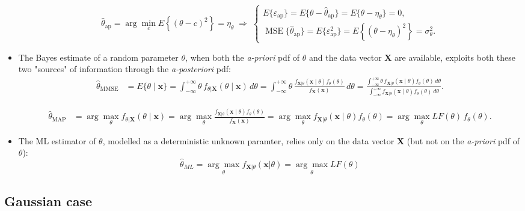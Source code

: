 \begin{itemize}
\[
\hat{\theta}_{\text{ap}}
 = \arg\min_{c} E\!\left\{(\theta - c)^{2}\right\}
 = \eta_{\theta}
 \;\Rightarrow\;
\begin{cases}
E\{\varepsilon_{\text{ap}}\}
 = E\{\theta - \hat{\theta}_{\text{ap}}\}
 = E\{\theta - \eta_{\theta}\}
 = 0, \\[4pt]
\operatorname{MSE}\{\hat{\theta}_{\text{ap}}\}
 = E\{\varepsilon_{\text{ap}}^{2}\}
 = E\!\left\{(\theta - \eta_{\theta})^{2}\right\}
 = \sigma_{\theta}^{2}.
\end{cases}
\]
\item The Bayes estimate of a random parameter \(\theta\), when both the \textit{a-priori} pdf of \(\theta\) and the data vector \textbf{X} are available, exploits both these two "sources" of information through the \textit{a-posteriori} pdf:
\begin{align*}
\hat{\theta}_{\text{MMSE}}
&= E\{\theta \mid \mathbf{x}\}
 = \int_{-\infty}^{+\infty}
   \theta \, f_{\theta|\mathbf{X}}(\theta \mid \mathbf{x}) \, d\theta
 = \int_{-\infty}^{+\infty}
   \theta \, \frac{f_{\mathbf{X}|\theta}(\mathbf{x}\mid \theta)
                 f_{\theta}(\theta)}
                {f_{\mathbf{X}}(\mathbf{x})} \, d\theta = \frac{\displaystyle
        \int_{-\infty}^{+\infty}
        \theta \, f_{\mathbf{X}|\theta}(\mathbf{x}\mid \theta)
               f_{\theta}(\theta) \, d\theta}
        {\displaystyle
        \int_{-\infty}^{+\infty}
        f_{\mathbf{X}|\theta}(\mathbf{x}\mid \theta)
        f_{\theta}(\theta) \, d\theta}.
\end{align*}

\begin{align*}
\hat{\theta}_{\text{MAP}}
&= \arg\max_{\theta} f_{\theta|\mathbf{X}}(\theta \mid \mathbf{x})
 = \arg\max_{\theta}
   \frac{f_{\mathbf{X}|\theta}(\mathbf{x}\mid \theta)
         f_{\theta}(\theta)}
        {f_{\mathbf{X}}(\mathbf{x})} = \arg\max_{\theta}
   f_{\mathbf{X}|\theta}(\mathbf{x}\mid \theta)
   f_{\theta}(\theta)
 = \arg\max_{\theta} LF(\theta)\, f_{\theta}(\theta).
\end{align*}

\item The ML estimator of \(\theta\), modelled as a deterministic unknown paramter, relies only on the data vector \textbf{X} (but not on the \textit{a-priori} pdf of \(\theta\)):
\[
\hat{\theta}_{ML}=\underset{\theta}{\arg\max}f_{\mathbf{X}|\theta}(\mathbf{x}|\theta)=\underset{\theta}{\arg\max}LF(\theta)
\]
\end{itemize}
\subsection{Gaussian case}
